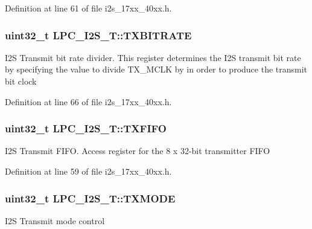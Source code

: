 Definition at line 61 of file i2s\+\_\+17xx\+\_\+40xx.\+h.

\subsubsection[{\texorpdfstring{T\+X\+B\+I\+T\+R\+A\+TE}{TXBITRATE}}]{ uint32\+\_\+t L\+P\+C\+\_\+\+I2\+S\+\_\+\+T\+::\+T\+X\+B\+I\+T\+R\+A\+TE}\hypertarget{structLPC__I2S__T_a16c60f11507aee3e4aef26c365a02ce2}{}\label{structLPC__I2S__T_a16c60f11507aee3e4aef26c365a02ce2}
I2S Transmit bit rate divider. This register determines the I2S transmit bit rate by specifying the value to divide T\+X\+\_\+\+M\+C\+LK by in order to produce the transmit bit clock 

Definition at line 66 of file i2s\+\_\+17xx\+\_\+40xx.\+h.

\subsubsection[{\texorpdfstring{T\+X\+F\+I\+FO}{TXFIFO}}]{ uint32\+\_\+t L\+P\+C\+\_\+\+I2\+S\+\_\+\+T\+::\+T\+X\+F\+I\+FO}\hypertarget{structLPC__I2S__T_aa3a381d218c4342917885fa3a51e82d8}{}\label{structLPC__I2S__T_aa3a381d218c4342917885fa3a51e82d8}
I2S Transmit F\+I\+FO. Access register for the 8 x 32-\/bit transmitter F\+I\+FO 

Definition at line 59 of file i2s\+\_\+17xx\+\_\+40xx.\+h.

\subsubsection[{\texorpdfstring{T\+X\+M\+O\+DE}{TXMODE}}]{ uint32\+\_\+t L\+P\+C\+\_\+\+I2\+S\+\_\+\+T\+::\+T\+X\+M\+O\+DE}\hypertarget{structLPC__I2S__T_a30384953ab71a349e60ed555b4ec4552}{}\label{structLPC__I2S__T_a30384953ab71a349e60ed555b4ec4552}
I2S Transmit mode control 

